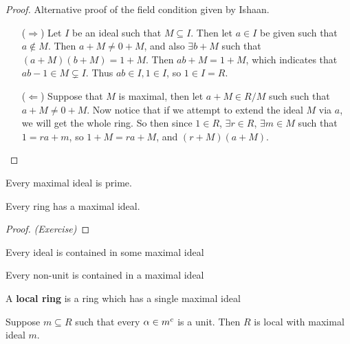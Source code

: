 \documentclass[12pt, twosided]{article}
\begin{document}
\begin{proof}
  Alternative proof of the field condition given by Ishaan.

  \begin{enumerate}
  \item [(\(\Rightarrow\))] Let \(I\) be an ideal such that \(M \subseteq I\). Then let \(a \in I\) be given such that \(a \not\in M\). Then \(a + M \neq 0 + M\), and also \(\exists b + M\) such that \((a + M)(b + M) = 1 + M\). Then \(ab + M  = 1+M\), which indicates that \(ab - 1 \in M \subsetneq I\). Thus \(ab \in I, 1 \in I\), so \(1 \in I = R\).
  \item [(\(\Leftarrow\))] Suppose that \(M\) is maximal, then let \(a + M \in R/M\) such such that \(a + M \neq 0 + M\). Now notice that if we attempt to extend the ideal \(M\) via \(a\), we will get the whole ring. So then since \(1 \in R\), \(\exists r \in R\), \(\exists m \in M\) such that \(1 = ra + m\), so \(1 + M = ra + M\), and \((r + M)(a + M)\).
  \end{enumerate}
\end{proof}
\begin{note}
  Every maximal ideal is prime.
\end{note}

\begin{prop}
  Every ring has a maximal ideal.
\end{prop}
\begin{proof}
  {\color{red} \textit{(Exercise)}}
\end{proof}

\begin{cor}
  Every ideal is contained in some maximal ideal
\end{cor}

\begin{cor}
  Every non-unit is contained in a maximal ideal
\end{cor}

\begin{df}
  A \textbf{local ring} is a ring which has a single maximal ideal
\end{df}

\begin{prop}
  Suppose \(m \subseteq R\) such that every \(\alpha \in m^c\) is a unit. Then \(R\) is local with maximal ideal \(m\).
\end{prop}
\end{document}
